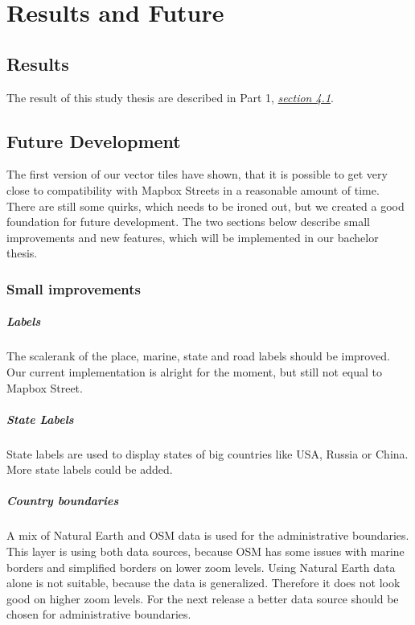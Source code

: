 \chapter{Results and Future}\label{part2_results_and_future}

\section{Results}\label{part2_results}
The result of this study thesis are described in Part 1, \hyperref[part1_results]{\emph{section 4.1}}.

\section{Future Development}\label{part2_future_development}
The first version of our vector tiles have shown, that it is possible to get very close to compatibility with Mapbox Streets in a reasonable amount of time. There are still some quirks, which needs to be ironed out, but we created a good foundation for future development. The two sections below describe small improvements and new features, which will be implemented in our bachelor thesis.

\subsection{Small improvements}\label{small_improvements}
 
\paragraph{Labels}
The scalerank of the place, marine, state and road labels should be improved. Our current implementation is alright for the moment, but still not equal to Mapbox Street.

\paragraph{State Labels}
State labels are used to display states of big countries like USA, Russia or China. More state labels could be added. 

\paragraph{Country boundaries}

A mix of Natural Earth and OSM data is used for the administrative boundaries.
This layer is using both data sources, because OSM has some issues with marine borders and simplified borders on lower zoom levels.
Using Natural Earth data alone is not suitable, because the data is generalized. Therefore it does not look good on higher zoom levels. For the next release a better data source should be chosen for administrative boundaries.

